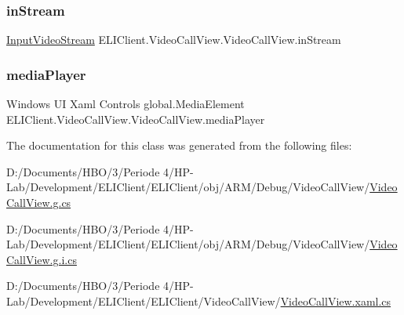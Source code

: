 \subsubsection{\texorpdfstring{in\+Stream}{inStream}}
{\footnotesize\ttfamily \hyperlink{class_e_l_i_client_1_1_input_video_stream}{Input\+Video\+Stream} E\+L\+I\+Client.\+Video\+Call\+View.\+Video\+Call\+View.\+in\+Stream\hspace{0.3cm}{\ttfamily [private]}}

\mbox{\label{class_e_l_i_client_1_1_video_call_view_1_1_video_call_view_afd5d83e04237864b1b66556f674bcd31}} 
\subsubsection{\texorpdfstring{media\+Player}{mediaPlayer}}
{\footnotesize\ttfamily Windows UI Xaml Controls global.\+Media\+Element E\+L\+I\+Client.\+Video\+Call\+View.\+Video\+Call\+View.\+media\+Player\hspace{0.3cm}{\ttfamily [private]}}



The documentation for this class was generated from the following files\+:\begin{DoxyCompactItemize}
\item 
D\+:/\+Documents/\+H\+B\+O/3/\+Periode 4/\+H\+P-\/\+Lab/\+Development/\+E\+L\+I\+Client/\+E\+L\+I\+Client/obj/\+A\+R\+M/\+Debug/\+Video\+Call\+View/\hyperlink{_a_r_m_2_debug_2_video_call_view_2_video_call_view_8g_8cs}{Video\+Call\+View.\+g.\+cs}\item 
D\+:/\+Documents/\+H\+B\+O/3/\+Periode 4/\+H\+P-\/\+Lab/\+Development/\+E\+L\+I\+Client/\+E\+L\+I\+Client/obj/\+A\+R\+M/\+Debug/\+Video\+Call\+View/\hyperlink{_a_r_m_2_debug_2_video_call_view_2_video_call_view_8g_8i_8cs}{Video\+Call\+View.\+g.\+i.\+cs}\item 
D\+:/\+Documents/\+H\+B\+O/3/\+Periode 4/\+H\+P-\/\+Lab/\+Development/\+E\+L\+I\+Client/\+E\+L\+I\+Client/\+Video\+Call\+View/\hyperlink{_video_call_view_8xaml_8cs}{Video\+Call\+View.\+xaml.\+cs}\end{DoxyCompactItemize}
